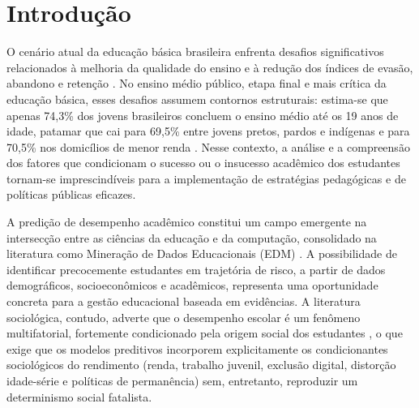 \chapter{Introdução}

O cenário atual da educação básica brasileira enfrenta desafios significativos relacionados à melhoria da qualidade do ensino e à redução dos índices de evasão, abandono e retenção \cite{dabreu2010, campos2024}. No ensino médio público, etapa final e mais crítica da educação básica, esses desafios assumem contornos estruturais: estima-se que apenas 74,3\% dos jovens brasileiros concluem o ensino médio até os 19 anos de idade, patamar que cai para 69,5\% entre jovens pretos, pardos e indígenas e para 70,5\% nos domicílios de menor renda \cite{todospelaeducacao2023}. Nesse contexto, a análise e a compreensão dos fatores que condicionam o sucesso ou o insucesso acadêmico dos estudantes tornam-se imprescindíveis para a implementação de estratégias pedagógicas e de políticas públicas eficazes.

A predição de desempenho acadêmico constitui um campo emergente na intersecção entre as ciências da educação e da computação, consolidado na literatura como Mineração de Dados Educacionais (EDM) \cite{baker2011, romero2010}. A possibilidade de identificar precocemente estudantes em trajetória de risco, a partir de dados demográficos, socioeconômicos e acadêmicos, representa uma oportunidade concreta para a gestão educacional baseada em evidências. A literatura sociológica, contudo, adverte que o desempenho escolar é um fenômeno multifatorial, fortemente condicionado pela origem social dos estudantes \cite{berlato2020, marturano2015}, o que exige que os modelos preditivos incorporem explicitamente os condicionantes sociológicos do rendimento (renda, trabalho juvenil, exclusão digital, distorção idade-série e políticas de permanência) sem, entretanto, reproduzir um determinismo social fatalista.

